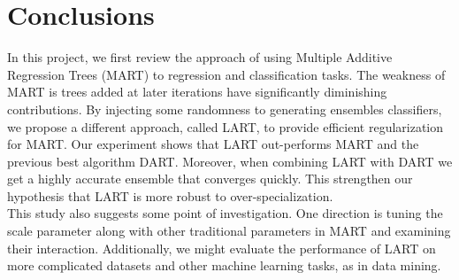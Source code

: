 \documentclass{article} %
\begin{document}
\begin{figure}	\centering
	

	
\end{figure}
\section{Conclusions}
In this project, we first review the approach of using Multiple Additive Regression Trees (MART) to regression and classification tasks. The weakness of MART is trees added at later iterations have significantly diminishing contributions. By injecting some randomness to generating ensembles classifiers, we propose a different approach, called LART, to provide efficient regularization for MART. Our experiment shows that LART out-performs MART and the previous best algorithm DART. Moreover, when combining LART with DART we get a highly accurate ensemble that converges quickly. This strengthen our hypothesis that LART is more robust to over-specialization.\\

This study also suggests some point of investigation. One direction is tuning the scale parameter along with other traditional parameters in MART and examining their interaction. Additionally, we might evaluate the performance of LART on more complicated datasets and other machine learning tasks, as in data mining.



\nocite{*}


\end{document}

